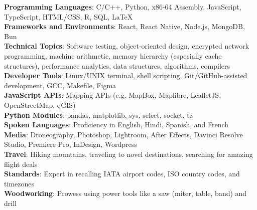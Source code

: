 % 
% 
% 
% 
% 
% 

\begin{itemize}[leftmargin=0in, label={}]
    \small{\item{
     \textbf{Programming Languages}{: C/C++, Python, x86-64 Assembly, JavaScript, TypeScript, 
     HTML/CSS, R, SQL, LaTeX} \\
     \textbf{Frameworks and Environments}{: React, React Native, Node.js, 
     MongoDB, Bun} \\
     \textbf{Technical Topics}{: Software testing, object-oriented design,
     encrypted network programming, machine arithmetic, memory hierarchy
     (especially cache structures), performance analytics, data structures,
     algorithms, compilers} \\
     \textbf{Developer Tools}{: Linux/UNIX terminal, shell scripting,
     Git/GitHub-assisted development, GCC, Makefile, Figma} \\
     \textbf{JavaScript APIs}{: Mapping APIs (e.g. MapBox, Maplibre, LeafletJS,
     OpenStreetMap, qGIS)} \\
     \textbf{Python Modules}{: pandas, matplotlib, sys, select, socket, tz} \\
     \textbf{Spoken Languages}{: Proficiency in English, Hindi, Spanish, and French} \\
     \textbf{Media}{: Droneography, Photoshop, Lightroom, After Effects, Davinci Resolve Studio, 
     Premiere Pro, InDesign, Wordpress} \\
     \textbf{Travel}{: Hiking mountains, traveling to novel destinations, 
     searching for amazing flight deals} \\
     \textbf{Standards}{: Expert in recalling IATA airport codes, ISO country codes, and timezones} \\
     \textbf{Woodworking}{: Prowess using power tools like a saw (miter, table, band) and drill} \\
     
    }}
\end{itemize}